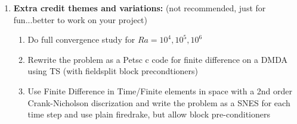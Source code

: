 \documentclass[11pt]{article}
\begin{document}
\begin{enumerate}
\begin{enumerate}
    \item Repeat the exercise for $Ra=10^4,10^5,10^6$
    \item For $Ra=10^4$, plot $Nu$ vs mesh size for $N\times N$ meshes with $N=16,32,64,128$ and compare to the results of Blankenbach benchmark 1 which predicts $Nu=4.884$.  Discuss.
   \end{enumerate}
   \item \textbf{Extra credit themes and variations:} (not recommended, just for fun...better to work on your project)
   \begin{enumerate}
    \item Do full convergence study for $Ra=10^4,10^5,10^6$
    \item Rewrite the problem as a Petsc c code for finite difference on a DMDA using TS (with fieldsplit block precondtioners)
    \item Use Finite Difference in Time/Finite elements in space  with a 2nd order Crank-Nicholson discrization and write the problem as a SNES for each time step and use plain firedrake, but allow block pre-conditioners
   \end{enumerate}
  \end{enumerate}

  
  
\end{document}
